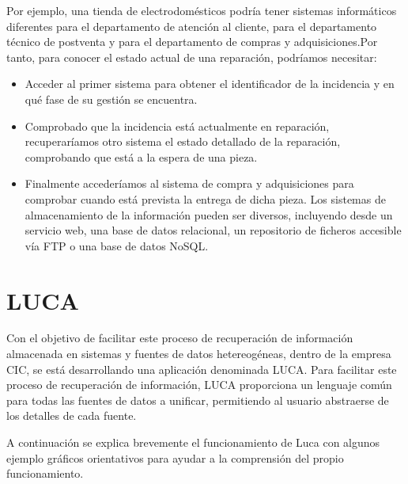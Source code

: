 Por ejemplo, una tienda de electrodomésticos podría tener sistemas informáticos diferentes para el departamento de atención al cliente, para el departamento técnico de postventa y para el departamento de compras y adquisiciones.Por tanto, para conocer el estado actual de una reparación, podríamos necesitar:
\begin{itemize}
	\item  Acceder al primer sistema para obtener el identificador de la incidencia y en qué fase de su gestión se encuentra.
	\item  Comprobado que la incidencia está actualmente en reparación, recuperaríamos otro sistema el estado detallado de la reparación, comprobando que está a la espera de una pieza.
	\item Finalmente accederíamos al sistema de compra y adquisiciones para comprobar cuando está prevista la entrega de dicha pieza. Los sistemas de almacenamiento de la información pueden ser diversos, incluyendo desde un servicio web, una base de datos relacional, un repositorio de ficheros accesible vía FTP o una base de datos NoSQL.
\end{itemize}


\section{LUCA}

			
Con el objetivo de facilitar este proceso de recuperación de información almacenada en sistemas y fuentes de datos hetereogéneas, dentro de la empresa CIC, se está desarrollando una aplicación denominada LUCA. Para facilitar este proceso de recuperación de información, LUCA proporciona un lenguaje común para todas las fuentes de datos a unificar, permitiendo al usuario abstraerse de los detalles de cada fuente.

\vspace{5mm}





A continuación se explica brevemente el funcionamiento de Luca con algunos ejemplo gráficos orientativos para ayudar a la comprensión del propio funcionamiento.

